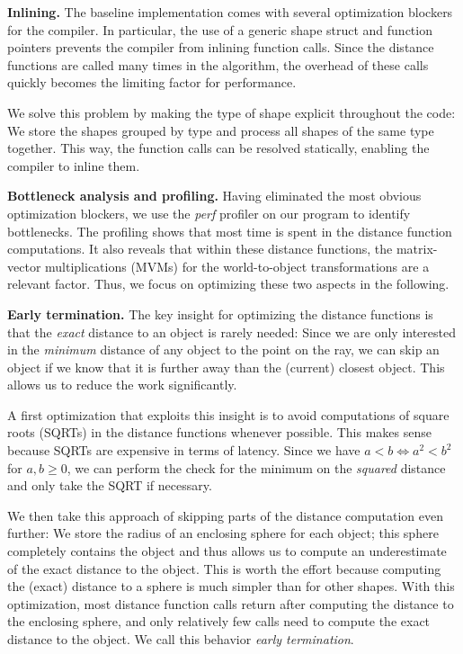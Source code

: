 \documentclass[letterpaper]{article}
\newcommand{\mypar}[1]{{\bf #1.}}
\begin{document}
\mypar{Inlining}
The baseline implementation comes with several optimization blockers for the compiler. In particular, the use of a generic shape struct and function pointers prevents the compiler from inlining function calls. Since the distance functions are called many times in the algorithm, the overhead of these calls quickly becomes the limiting factor for performance.

We solve this problem by making the type of shape explicit throughout the code: We store the shapes grouped by type and process all shapes of the same type together. This way, the function calls can be resolved statically, enabling the compiler to inline them.

\mypar{Bottleneck analysis and profiling}
Having eliminated the most obvious optimization blockers, we use the \emph{perf} profiler on our program to identify bottlenecks. The profiling shows that most time is spent in the distance function computations. It also reveals that within these distance functions, the matrix-vector multiplications (MVMs) for the world-to-object transformations are a relevant factor.
Thus, we focus on optimizing these two aspects in the following.

\mypar{Early termination}
The key insight for optimizing the distance functions is that the \emph{exact} distance to an object is rarely needed: Since we are only interested in the \emph{minimum} distance of any object to the point on the ray, we can skip an object if we know that it is further away than the (current) closest object. This allows us to reduce the work significantly.

A first optimization that exploits this insight is to avoid computations of square roots (SQRTs) in the distance functions whenever possible. This makes sense because SQRTs are expensive in terms of latency. Since we have $a < b \iff a^2 < b^2$ for $a, b \geq 0 $, we can perform the check for the minimum on the \emph{squared} distance and only take the SQRT if necessary.

We then take this approach of skipping parts of the distance computation even further: We store the radius of an enclosing sphere for each object; this sphere completely contains the object and thus allows us to compute an underestimate of the exact distance to the object. This is worth the effort because computing the (exact) distance to a sphere is much simpler than for other shapes. With this optimization, most distance function calls return after computing the distance to the enclosing sphere, and only relatively few calls need to compute the exact distance to the object. We call this behavior \emph{early termination}.
\end{document}
